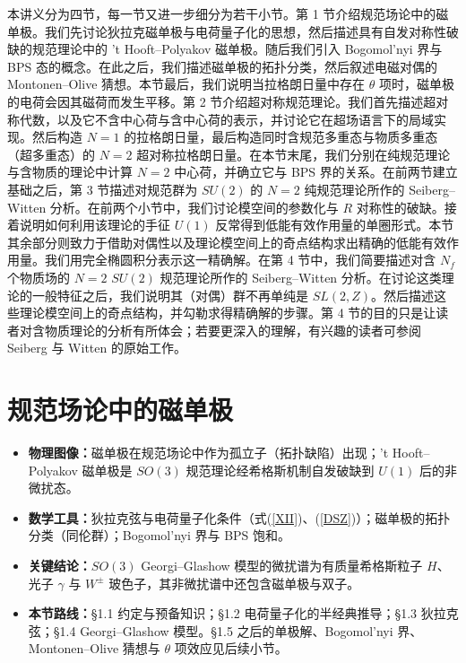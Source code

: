 本讲义分为四节，每一节又进一步细分为若干小节。第 1 节介绍规范场论中的磁单极。我们先讨论狄拉克磁单极与电荷量子化的思想，然后描述具有自发对称性破缺的规范理论中的 't Hooft–Polyakov 磁单极。随后我们引入 Bogomol'nyi 界与 BPS 态的概念。在此之后，我们描述磁单极的拓扑分类，然后叙述电磁对偶的 Montonen–Olive 猜想。本节最后，我们说明当拉格朗日量中存在 $\theta$ 项时，磁单极的电荷会因其磁荷而发生平移。第 2 节介绍超对称规范理论。我们首先描述超对称代数，以及它不含中心荷与含中心荷的表示，并讨论它在超场语言下的局域实现。然后构造 $N=1$ 的拉格朗日量，最后构造同时含规范多重态与物质多重态（超多重态）的 $N=2$ 超对称拉格朗日量。在本节末尾，我们分别在纯规范理论与含物质的理论中计算 $N=2$ 中心荷，并确立它与 BPS 界的关系。在前两节建立基础之后，第 3 节描述对规范群为 $SU(2)$ 的 $N=2$ 纯规范理论所作的 Seiberg–Witten 分析。在前两个小节中，我们讨论模空间的参数化与 $R$ 对称性的破缺。接着说明如何利用该理论的手征 $U(1)$ 反常得到低能有效作用量的单圈形式。本节其余部分则致力于借助对偶性以及理论模空间上的奇点结构求出精确的低能有效作用量。我们用完全椭圆积分表示这一精确解。在第 4 节中，我们简要描述对含 $N_f$ 个物质场的 $N=2$ $SU(2)$ 规范理论所作的 Seiberg–Witten 分析。在讨论这类理论的一般特征之后，我们说明其（对偶）群不再单纯是 $SL(2,Z)$。然后描述这些理论模空间上的奇点结构，并勾勒求得精确解的步骤。第 4 节的目的只是让读者对含物质理论的分析有所体会；若要更深入的理解，有兴趣的读者可参阅 Seiberg 与 Witten 的原始工作。


\section{规范场论中的磁单极}

\begin{keypoints}
\begin{itemize}
  \item \textbf{物理图像：}磁单极在规范场论中作为孤立子（拓扑缺陷）出现；'t Hooft–Polyakov 磁单极是 $SO(3)$ 规范理论经希格斯机制自发破缺到 $U(1)$ 后的非微扰态。
  \item \textbf{数学工具：}狄拉克弦与电荷量子化条件（式(\ref{XII})、(\ref{DSZ})）；磁单极的拓扑分类（同伦群）；Bogomol'nyi 界与 BPS 饱和。
  \item \textbf{关键结论：}$SO(3)$ Georgi–Glashow 模型的微扰谱为有质量希格斯粒子 $H$、光子 $\gamma$ 与 $W^\pm$ 玻色子，其非微扰谱中还包含磁单极与双子。
  \item \textbf{本节路线：}§1.1 约定与预备知识；§1.2 电荷量子化的半经典推导；§1.3 狄拉克弦；§1.4 Georgi–Glashow 模型。§1.5 之后的单极解、Bogomol'nyi 界、Montonen–Olive 猜想与 $\theta$ 项效应见后续小节。
\end{itemize}
\end{keypoints}

